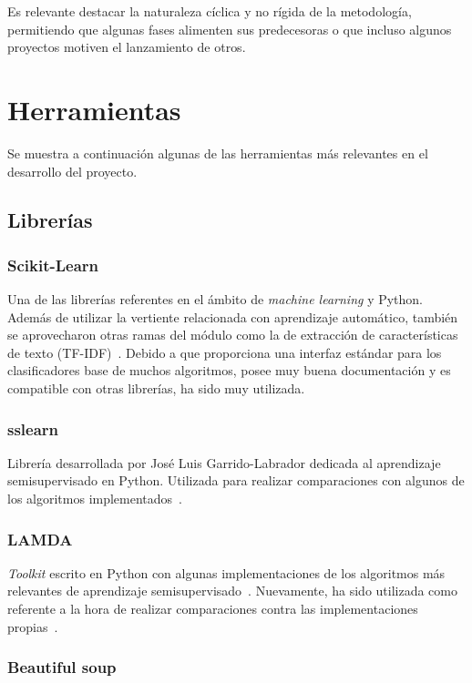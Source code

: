 Es relevante destacar la naturaleza cíclica y no rígida de la metodología, permitiendo que algunas fases alimenten sus predecesoras o que incluso algunos proyectos motiven el lanzamiento de otros.

\section{Herramientas}

Se muestra a continuación algunas de las herramientas más relevantes en el desarrollo del proyecto.

\subsection{Librerías}

\subsubsection{Scikit-Learn}

Una de las librerías referentes en el ámbito de \textit{machine learning} y Python. Además de utilizar la vertiente relacionada con aprendizaje automático, también se aprovecharon otras ramas del módulo como la de extracción de características de texto (TF-IDF)~\cite{sslearnRepo}. Debido a que proporciona una interfaz estándar para los clasificadores base de muchos algoritmos, posee muy buena documentación y es compatible con otras librerías, ha sido muy utilizada.

\subsubsection{sslearn}

Librería desarrollada por José Luis Garrido-Labrador dedicada al aprendizaje semisupervisado en Python. Utilizada para realizar comparaciones con algunos de los algoritmos implementados~\cite{sslearnRepo}.

\subsubsection{LAMDA}

\textit{Toolkit} escrito en Python con algunas implementaciones de los algoritmos más relevantes de aprendizaje semisupervisado~\cite{lamdasslRepo}. Nuevamente, ha sido utilizada como referente a la hora de realizar comparaciones contra las implementaciones propias~\cite{lamdasslPaper}.

\subsubsection{Beautiful soup}

